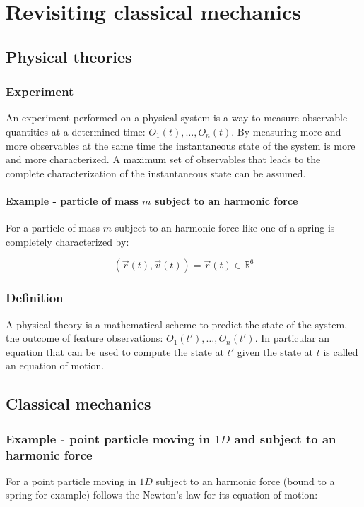 \chapter{Revisiting classical mechanics}

\section{Physical theories}

  \subsection{Experiment}
  An experiment performed on a physical system is a way to measure observable quantities at a determined time: $O_1(t), \dots, O_n(t)$.
  By measuring more and more observables at the same time the instantaneous state of the system is more and more characterized.
  A maximum set of observables that leads to the complete characterization of the instantaneous state can be assumed.

    \subsubsection{Example - particle of mass $m$ subject to an harmonic force}
    For a particle of mass $m$ subject to an harmonic force like one of a spring is completely characterized by: 
    
    $$(\vec{r}(t),\vec{v}(t))=\vec{r}(t)\in \mathbb{R}^6$$

  \subsection{Definition}
  A physical theory is a mathematical scheme to predict the state of the system, the outcome of feature observations: $O_1(t'), \dots, O_n(t')$.
  In particular an equation that can be used to compute the state at $t'$ given the state at $t$ is called an equation of motion.

\section{Classical mechanics}

  \subsection{Example - point particle moving in $1D$ and subject to an harmonic force}
  For a point particle moving in $1D$ subject to an harmonic force (bound to a spring for example) follows the Newton's law for its equation of motion:

